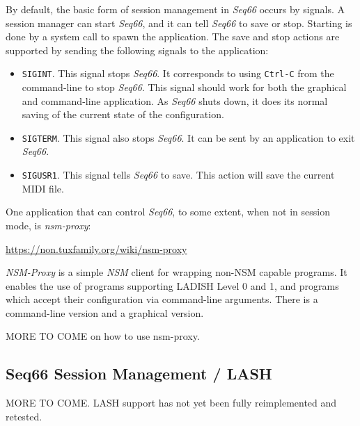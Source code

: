    By default, the basic form of session management in
   \textsl{Seq66} occurs by signals.  A
   session manager can start \textsl{Seq66}, and it can tell \textsl{Seq66} to
   save or stop.  Starting is done by a system call to spawn the application.
   The save and stop actions are supported by sending the following signals to
   the application:

   \begin{itemize}
      \item \texttt{SIGINT}.
         This signal stops \textsl{Seq66}. It corresponds
         to using \texttt{Ctrl-C} from the command-line to stop \textsl{Seq66}.
         This signal should work for both the graphical and command-line
         application.  As \textsl{Seq66} shuts down, it does its normal saving
         of the current state of the configuration.
      \item \texttt{SIGTERM}.
         This signal also stops \textsl{Seq66}.  It can
         be sent by an application to exit \textsl{Seq66}.
      \item \texttt{SIGUSR1}.
         This signal tells \textsl{Seq66} to save.  This
         action will save the current MIDI file.
   \end{itemize}

   One application that can control \textsl{Seq66}, to some extent, when not in
   session mode, is \textsl{nsm-proxy}:

      \url{https://non.tuxfamily.org/wiki/nsm-proxy}

   \textsl{NSM-Proxy} is a simple \textsl{NSM} client for wrapping non-NSM
   capable programs. It enables the use of programs supporting LADISH Level 0
   and 1, and programs which accept their configuration via command-line
   arguments.  There is a command-line version and a graphical version.

   MORE TO COME on how to use nsm-proxy.

\subsection{Seq66 Session Management / LASH}
\label{subsec:sessions_lash}

   MORE TO COME.
   LASH support has not yet been fully reimplemented and retested.

